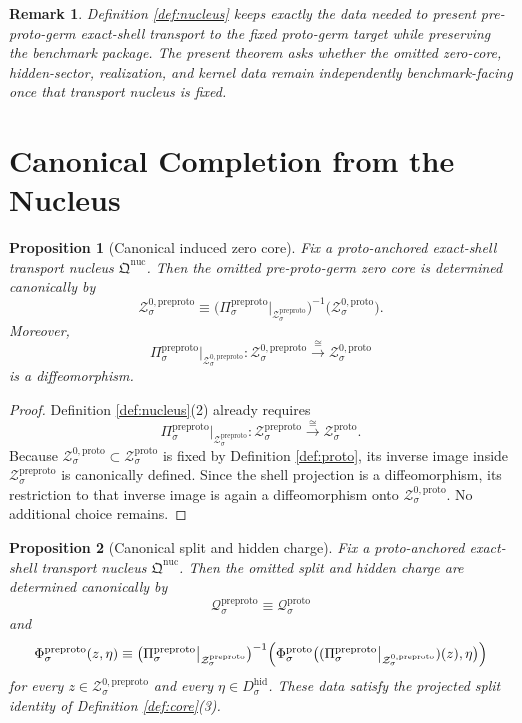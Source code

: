 \documentclass[11pt]{article}
\newcommand{\HiddenBody}[1]{D_{#1}^{\mathrm{hid}}}
\newcommand{\ProtoShellSet}[1]{\mathcal Z_{#1}^{\mathrm{proto}}}
\newcommand{\ProtoZeroCore}[1]{\mathcal Z_{#1}^{0,\mathrm{proto}}}
\newcommand{\ProtoSplit}[1]{\Phi_{#1}^{\mathrm{proto}}}
\newcommand{\ProtoCharge}[1]{\mathcal Q_{#1}^{\mathrm{proto}}}
\newcommand{\PreProtoNucleus}{\mathfrak Q^{\mathrm{nuc}}}
\newcommand{\PreProtoProj}[1]{\Pi_{#1}^{\mathrm{preproto}}}
\newcommand{\PreProtoShellSet}[1]{\mathcal Z_{#1}^{\mathrm{preproto}}}
\newcommand{\PreProtoZeroCore}[1]{\mathcal Z_{#1}^{0,\mathrm{preproto}}}
\newcommand{\PreProtoSplit}[1]{\Phi_{#1}^{\mathrm{preproto}}}
\newcommand{\PreProtoCharge}[1]{\mathcal Q_{#1}^{\mathrm{preproto}}}
\newtheorem{proposition}{Proposition}
\newtheorem{remark}{Remark}
\begin{document}
\begin{remark}
Definition \ref{def:nucleus} keeps exactly the data needed to present pre-proto-germ exact-shell transport to the fixed proto-germ target while preserving the benchmark package. The present theorem asks whether the omitted zero-core, hidden-sector, realization, and kernel data remain independently benchmark-facing once that transport nucleus is fixed.
\end{remark}

\section{Canonical Completion from the Nucleus}

\begin{proposition}[Canonical induced zero core]
\label{prop:zero}
Fix a proto-anchored exact-shell transport nucleus \(\PreProtoNucleus\). Then the omitted pre-proto-germ zero core is determined canonically by
\[
\PreProtoZeroCore{\sigma}
\equiv
\bigl(\PreProtoProj{\sigma}\big|_{\PreProtoShellSet{\sigma}}\bigr)^{-1}
\bigl(\ProtoZeroCore{\sigma}\bigr).
\]
Moreover,
\[
\PreProtoProj{\sigma}\big|_{\PreProtoZeroCore{\sigma}}
:
\PreProtoZeroCore{\sigma}
\xrightarrow{\cong}
\ProtoZeroCore{\sigma}
\]
is a diffeomorphism.
\end{proposition}

\begin{proof}
Definition \ref{def:nucleus}(2) already requires
\[
\PreProtoProj{\sigma}\big|_{\PreProtoShellSet{\sigma}}
:
\PreProtoShellSet{\sigma}
\xrightarrow{\cong}
\ProtoShellSet{\sigma}.
\]
Because \(\ProtoZeroCore{\sigma}\subset\ProtoShellSet{\sigma}\) is fixed by Definition \ref{def:proto}, its inverse image inside \(\PreProtoShellSet{\sigma}\) is canonically defined. Since the shell projection is a diffeomorphism, its restriction to that inverse image is again a diffeomorphism onto \(\ProtoZeroCore{\sigma}\). No additional choice remains.
\end{proof}

\begin{proposition}[Canonical split and hidden charge]
\label{prop:split}
Fix a proto-anchored exact-shell transport nucleus \(\PreProtoNucleus\). Then the omitted split and hidden charge are determined canonically by
\[
\PreProtoCharge{\sigma}\equiv \ProtoCharge{\sigma}
\]
and
\[
\PreProtoSplit{\sigma}(z,\eta)
\equiv
\bigl(\PreProtoProj{\sigma}\big|_{\PreProtoShellSet{\sigma}}\bigr)^{-1}
\Bigl(
\ProtoSplit{\sigma}\bigl(
(\PreProtoProj{\sigma}\big|_{\PreProtoZeroCore{\sigma}})(z),\eta
\bigr)
\Bigr)
\]
for every \(z\in\PreProtoZeroCore{\sigma}\) and every \(\eta\in\HiddenBody{\sigma}\).
These data satisfy the projected split identity of Definition \ref{def:core}(3).
\end{proposition}
\end{document}
